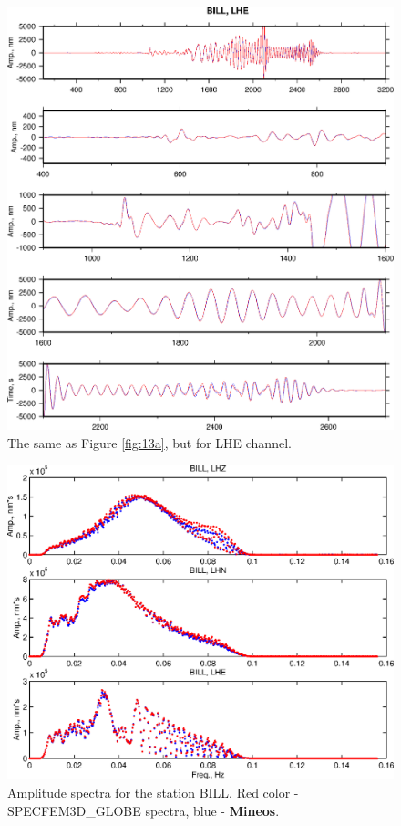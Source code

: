 \begin{figure}
\begin{center}
\includegraphics[width=7 in]{Figures/FigsBILLLHE}
\caption{ The same as Figure \ref{fig:13a}, but for LHE channel.}
\label{fig:15a}
\end{center}
\end{figure}

\begin{figure}
\begin{center}
\includegraphics[width=7 in]{Figures/FspBILL}
\caption{Amplitude spectra for the station BILL. Red color - SPECFEM3D\_GLOBE spectra, blue - {\bf Mineos}.}
\label{fig:16a}
\end{center}
\end{figure}

